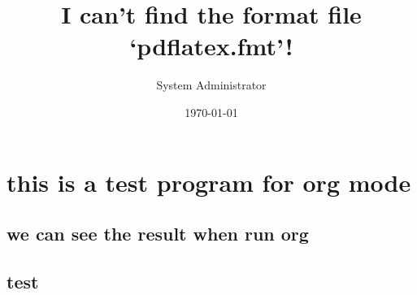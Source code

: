 \documentclass[11pt]{article}
\title{I can't find the format file `pdflatex.fmt'!}
\author{System Administrator}
\date{\today}
\begin{document}
\maketitle

\setcounter{tocdepth}{3}
\tableofcontents
\vspace*{1cm}
\section{this is a test program for org mode}
\label{sec-1}
\subsection{we can see the result when run org}
\label{sec-1-1}
\subsection{test}
\label{sec-1-2}
\end{document}
